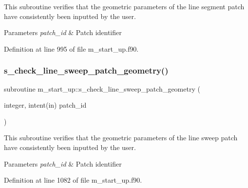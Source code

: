This subroutine verifies that the geometric parameters of the line segment patch have consistently been inputted by the user. 


\begin{DoxyParams}{Parameters}
{\em patch\+\_\+id} & Patch identifier \\
\hline
\end{DoxyParams}


Definition at line 995 of file m\+\_\+start\+\_\+up.\+f90.

\mbox{\label{namespacem__start__up_af838464749f53bf064afdba3c261ac83}} 
\subsubsection{\texorpdfstring{s\+\_\+check\+\_\+line\+\_\+sweep\+\_\+patch\+\_\+geometry()}{s\_check\_line\_sweep\_patch\_geometry()}}
{\footnotesize\ttfamily subroutine m\+\_\+start\+\_\+up\+::s\+\_\+check\+\_\+line\+\_\+sweep\+\_\+patch\+\_\+geometry (\begin{DoxyParamCaption}\item[{integer, intent(in)}]{patch\+\_\+id }\end{DoxyParamCaption})}



This subroutine verifies that the geometric parameters of the line sweep patch have consistently been inputted by the user. 


\begin{DoxyParams}{Parameters}
{\em patch\+\_\+id} & Patch identifier \\
\hline
\end{DoxyParams}


Definition at line 1082 of file m\+\_\+start\+\_\+up.\+f90.

\mbox{\label{namespacem__start__up_aae294c405210613a2466358f3af3fd90}} 

